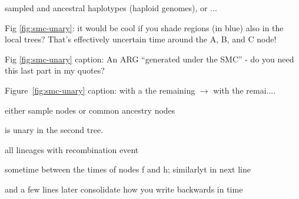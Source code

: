 
\begin{point}{\revref} %
 sampled and ancestral haplotypes (haploid genomes), or ...
\end{point}


\begin{point}{Fig \ref{fig:smc-unary}:}
 it would be cool if you shade regions (in blue) also in the local trees? That's effectively uncertain time around the A, B, and C node!
\end{point}

\reply{
}

\begin{point}{Fig \ref{fig:smc-unary} caption:}
An ARG ``generated under the SMC'' - do you need this last part in my quotes?
\end{point}


\begin{point}{Figure~\ref{fig:smc-unary} caption:}
with a the remaining $\to$ with the remai....
\end{point}


\begin{point}{\revref} %
 either sample nodes or common ancestry nodes
\end{point}


\begin{point}{\revref} %
 is unary in the second tree.
\end{point}


\begin{point}{\revref} %
 all lineages with recombination event
\end{point}


\begin{point}{\revref} %
 sometime between the times of nodes f and h; similarlyt in next line %
\end{point}


\begin{point}{\revref{} and a few lines later} %
 consolidate how you write backwards in time
\end{point}

